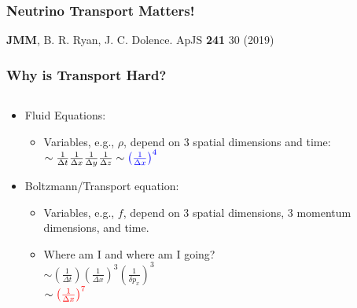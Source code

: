 \documentclass[]{beamer}
\begin{document}
\begin{frame}
  \frametitle{Neutrino Transport Matters!}
  \begin{center}
  \end{center}
  \begin{tiny}
    \textbf{JMM}, B. R. Ryan, J. C. Dolence. ApJS \textbf{241} 30 (2019) 
  \end{tiny}
\end{frame}

\begin{frame}
  \frametitle{Why is Transport Hard?}
  \begin{columns}
    \begin{column}{8cm}
      \begin{itemize}
      \item Fluid Equations:
        \begin{itemize}
        \item Variables, e.g., $\rho$, depend on 3 spatial dimensions
          and time:\\
          $\sim \frac{1}{\Delta t} \frac{1}{\Delta x}\frac{1}{\Delta y}\frac{1}{\Delta z} \sim {\color{blue}\left(\frac{1}{\Delta x}\right)^4}$
        \end{itemize}
      \item Boltzmann/Transport equation:
        \begin{itemize}
        \item Variables, e.g., $f$, depend on 3 spatial dimensions, 3 momentum dimensions, and time.
        \item Where am I and where am I going?\\
          $\sim \left(\frac{1}{\Delta t}\right)\left(\frac{1}{\Delta x}\right)^3\left(\frac{1}{\delta p_x}\right)^3$\\
          $\sim {\color{red}\left(\frac{1}{\Delta x}\right)^7}$
        \end{itemize}
      \end{itemize}
    \end{column}
    \begin{column}{4cm}
      \begin{center}
      \end{center}
    \end{column}
  \end{columns}
\end{frame}
\end{document}
